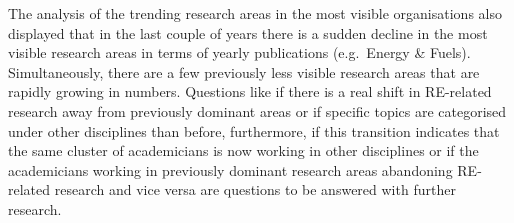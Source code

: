 \documentclass[
]{book}
\begin{document}
The analysis of the trending research areas in the most visible organisations also displayed that in the last couple of years there is a sudden decline in the most visible research areas in terms of yearly publications (e.g.~Energy \& Fuels). Simultaneously, there are a few previously less visible research areas that are rapidly growing in numbers. Questions like if there is a real shift in RE-related research away from previously dominant areas or if specific topics are categorised under other disciplines than before, furthermore, if this transition indicates that the same cluster of academicians is now working in other disciplines or if the academicians working in previously dominant research areas abandoning RE-related research and vice versa are questions to be answered with further research.

\hypertarget{refs}{}
\end{document}
